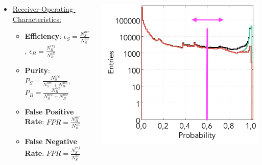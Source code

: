 \documentclass[xcolor=table, xcolor=dvipsnames]{beamer}
\begin{document}
\begin{frame}
 \begin{columns}
 \begin{column}{7cm}
 \begin{itemize}
  \item \underline{Receiver-Operating-Characteristics:}
  \begin{itemize}
    \scriptsize
    \item {\bf Efficiency}: $\epsilon_{S} = \frac{N^{acc}_{S}}{N^{all}_{S}}$, $\epsilon_{B} = \frac{N^{rej}_{B}}{N^{all}_{B}}$
    \item {\bf Purity}: $P_S = \frac{N^{acc}_{S}}{N^{acc}_{S} + N^{acc}_{B}}$, $P_B = \frac{N^{acc}_{B}}{N^{acc}_{S} + N^{acc}_{B}}$
    \item {\bf False Positive Rate}: $FPR =  \frac{N^{acc}_{B}}{N^{all}_{B}}$
    \item {\bf False Negative Rate}: $FPR =  \frac{N^{rej}_{S}}{N^{all}_{S}}$
  \end{itemize}
 \end{itemize}
 \end{column}
 
 \begin{column}{5cm}
  \includegraphics[width=1.05\textwidth,height=0.65\textwidth]{probMLP_HL85V123456N6000R1.png}
 \end{column}
 \end{columns}
\end{frame}
\end{document}
